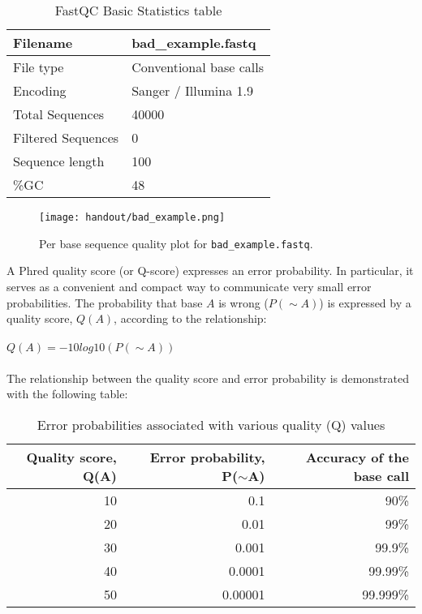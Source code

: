 \begin{table}[H]
  \centering
  \caption{FastQC Basic Statistics table}
    \begin{tabular}{ll}
    \toprule
    Filename & bad\_example.fastq \\
    \midrule
    File type & Conventional base calls \\
    Encoding & Sanger / Illumina 1.9 \\
    Total Sequences & 40000 \\
    Filtered Sequences & 0 \\
    Sequence length & 100 \\
    \%GC  & 48 \\
    \bottomrule
    \end{tabular}
  \label{tab:badexampleuntrimmed}
\end{table}

\begin{figure}[H]
\centering
\texttt{[image: handout/bad\_example.png]}
\caption{Per base sequence quality plot for \texttt{bad\_example.fastq}.}
\label{fig:bad_example_untrimmed_plot}
\end{figure}

\begin{information}
A Phred quality score (or Q-score) expresses an error probability.  In particular, it
serves as a convenient and compact way to communicate very small error
probabilities.
The probability that base $A$ is wrong ($P(\sim A)$) is expressed
by a quality score, $Q(A)$, according to the relationship:
\\\\
$Q(A) =-10 log10(P(\sim A))$
\\\\
The relationship between the quality score and error probability is demonstrated
with the following table:

\begin{table}[H]
  \centering
  \caption{Error probabilities associated with various quality (Q) values}
    \begin{tabular}{rrr}
    \toprule
    \textbf{Quality score, Q(A)} & \textbf{Error probability, P($\sim$A)} & \textbf{Accuracy of the base call} \\
    \midrule
    10    & 0.1     & 90\% \\
    20    & 0.01    & 99\% \\
    30    & 0.001   & 99.9\% \\
    40    & 0.0001  & 99.99\% \\
    50    & 0.00001 & 99.999\% \\
    \bottomrule
    \end{tabular}
  \label{tab:quality_error_probs}
\end{table}

\end{information}

